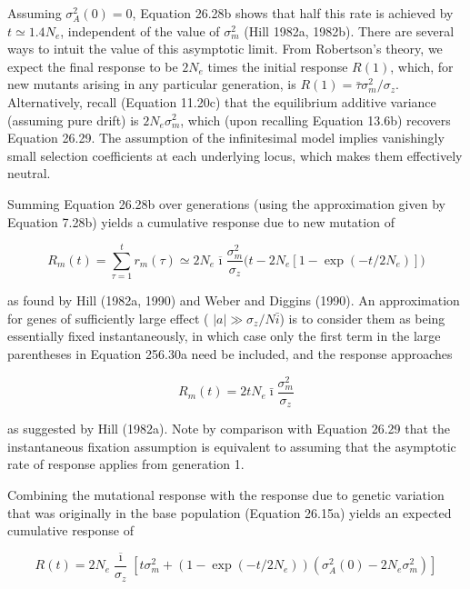 \documentclass{article}
\begin{document}
{Assuming  $ \sigma_A^2(0) = 0 $, Equation 26.28b shows that half this rate is achieved by  $ t \simeq 1.4N_e $, independent of the value of  $ \sigma_m^2 $ (Hill 1982a, 1982b). There are several ways to intuit the value of this asymptotic limit. From Robertson’s theory, we expect the final response to be  $ 2N_e $ times the initial response  $ R(1) $, which, for new mutants arising in any particular generation, is  $ R(1) = \bar{\tau} \sigma_m^2 / \sigma_z $. Alternatively, recall (Equation 11.20c) that the equilibrium additive variance (assuming pure drift) is  $ 2N_e \sigma_m^2 $, which (upon recalling Equation 13.6b) recovers Equation 26.29. The assumption of the infinitesimal model implies vanishingly small selection coefficients at each underlying locus, which makes them effectively neutral.

Summing Equation 26.28b over generations (using the approximation given by Equation 7.28b) yields a cumulative response due to new mutation of

\begin{equation}
R_{m}(t)=\sum_{\tau=1}^{t}r_{m}(\tau)\simeq2N_{e}\overline{\imath}\frac{\sigma_{m}^{2}}{\sigma_{z}}\bigg(t-2N_{e}[1-\exp(-t/2N_{e})]\bigg)
\tag{26.30a}
\label{eq:26_30a}
\end{equation}

as found by Hill (1982a, 1990) and Weber and Diggins (1990). An approximation for genes of sufficiently large effect ( $ |a| \gg \sigma_z/N\bar{i} $) is to consider them as being essentially fixed instantaneously, in which case only the first term in the large parentheses in Equation 256.30a need be included, and the response approaches

\begin{equation}
R_{m}(t)=2t N_{e}\bar{\imath}\frac{\sigma_{m}^{2}}{\sigma_{z}}
\tag{26.30b}
\label{eq:26_30b}
\end{equation}

as suggested by Hill (1982a). Note by comparison with Equation 26.29 that the instantaneous fixation assumption is equivalent to assuming that the asymptotic rate of response applies from generation 1.

Combining the mutational response with the response due to genetic variation that was originally in the base population (Equation 26.15a) yields an expected cumulative response of

\begin{equation}
R(t)=2N_{e}\frac{\overline{\imath}}{\sigma_{z}}\left[t\sigma_{m}^{2}+\left(1-\exp(-t/2N_{e})\right)\left(\sigma_{A}^{2}(0)-2N_{e}\sigma_{m}^{2}\right)\right]
\tag{26.30c}
\label{eq:26_30c}
\end{equation}

}
\end{document}
